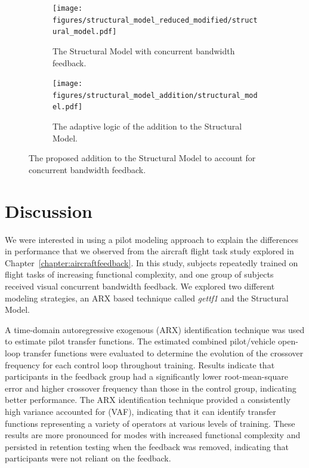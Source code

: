 \begin{figure}[tbp]
    \centering
    \begin{subfigure}{\textwidth}
        \centering
        \texttt{[image: figures/structural\_model\_reduced\_modified/structural\_model.pdf]}
        \caption[The Structural Model with concurrent bandwidth feedback]{The Structural Model with concurrent bandwidth feedback.}
        \label{fig:structuralmodel_feedback}
    \end{subfigure}
    \hfill
    \begin{subfigure}{\textwidth}
        \centering
        \texttt{[image: figures/structural\_model\_addition/structural\_model.pdf]}
        \caption[The adaptive logic of the addition to the Structural Model]{The adaptive logic of the addition to the Structural Model.}
        \label{fig:structuralmodel_feedbackblock}
    \end{subfigure}
    \caption[The proposed addition to the Structural Model to account for concurrent bandwidth feedback]{The proposed addition to the Structural Model to account for concurrent bandwidth feedback.}
\end{figure}

\section{Discussion}
We were interested in using a pilot modeling approach to explain the differences in performance that we observed from the aircraft flight task study explored in Chapter~\ref{chapter:aircraftfeedback}.
In this study, subjects repeatedly trained on flight tasks of increasing functional complexity, and one group of subjects received visual concurrent bandwidth feedback.
We explored two different modeling strategies, an ARX based technique called \textit{gettf1} and the Structural Model.

A time-domain autoregressive exogenous (ARX) identification technique was used to estimate pilot transfer functions.
The estimated combined pilot/vehicle open-loop transfer functions were evaluated to determine the evolution of the crossover frequency for each control loop throughout training.
Results indicate that participants in the feedback group had a significantly lower root-mean-square error and higher crossover frequency than those in the control group, indicating better performance.
The ARX identification technique provided a consistently high variance accounted for (VAF), indicating that it can identify transfer functions representing a variety of operators at various levels of training.
These results are more pronounced for modes with increased functional complexity and persisted in retention testing when the feedback was removed, indicating that participants were not reliant on the feedback.

